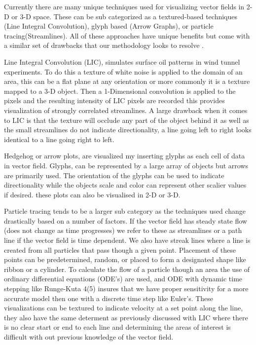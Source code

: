  Currently there are many unique techniques used for visualizing vector fields in 2-D or 3-D space. These can be sub categorized as a textured-based techniques (Line Integral Convolution), glyph based (Arrow Graphs), or particle tracing(Streamlines). All of these approaches have unique benefits but come with a similar set of drawbacks that our methodology looks to resolve .

Line Integral Convolution (LIC), simulates surface oil patterns in wind tunnel experiments. To do this a texture of white noise is applied to the domain of an area, this can be a flat plane at any orientation or more commonly it is a texture mapped to a 3-D object. Then a 1-Dimensional convolution is applied to the pixels and the resulting intensity of LIC pixels are recorded this provides visualization of strongly correlated streamlines. A large drawback when it comes to LIC is that the texture will occlude any part of the object behind it as well as the small streamlines do not indicate directionality, a line going left to right looks identical to a line going right to left.

Hedgehog or arrow plots,  are visualized my inserting glyphs as each cell of data in  vector field. Glyphs, can be represented by a large array of objects but arrows are primarily used. The orientation of the glyphs can be used to indicate directionality while the objects scale and color can represent other scalier values if desired. these plots  can also be visualised in 2-D or 3-D. 

Particle tracing tends to be a larger sub category as the techniques used change drastically based on a number of factors. If the vector field  has steady state flow (does not change as time progresses) we refer to these as streamlines or a path line if the vector field is time dependent. We also have streak lines where a line is created from all particles that pass though a given point. Placement of these points can be predetermined, random, or placed to form a designated shape like ribbon or a cylinder. To calculate the flow of a particle though an area the use of ordinary differential equations (ODE’s) are used, and ODE with dynamic time stepping like Runge-Kuta 4(5) insures that we have proper sensitivity for a more accurate model then one with a discrete time step like Euler’s. These visualizations can be textured to indicate velocity at a set point along the line, they also  have the same determent as previously discussed with LIC where there is no clear start or end to each line and determining the areas of interest is difficult with out previous knowledge of the vector field.  

